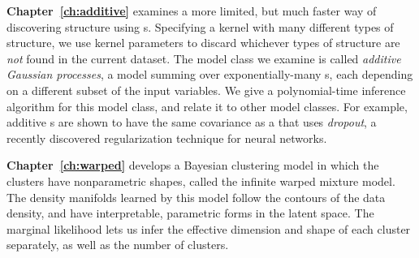 {\bf Chapter~\ref{ch:additive}} examines a more limited, but much faster way of discovering structure using \gp{}s.
Specifying a kernel with many different types of structure, we use kernel parameters to discard whichever types of structure are \emph{not} found in the current dataset.
The model class we examine is called \emph{additive Gaussian processes}, a model summing over exponentially-many \gp{}s, each depending on a different subset of the input variables.
We give a polynomial-time inference algorithm for this model class, and relate it to other model classes.
For example, additive \gp{}s are shown to have the same covariance as a \gp{} that uses \emph{dropout}, a recently discovered regularization technique for neural networks.

{\bf Chapter~\ref{ch:warped}} develops a Bayesian clustering model in which the clusters have nonparametric shapes, called the infinite warped mixture model.
The density manifolds learned by this model follow the contours of the data density, and have interpretable, parametric forms in the latent space.
The marginal likelihood lets us infer the effective dimension and shape of each cluster separately, as well as the number of clusters.

\outbpdocument{


}


